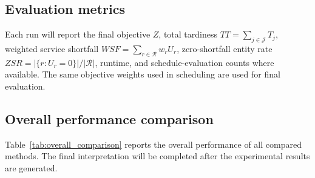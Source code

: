\documentclass[a4paper,fleqn]{cas-sc}
\begin{document}
\subsection{Evaluation metrics}
\label{sec:evaluation_metrics}

Each run will report the final objective \(Z\), total tardiness \(TT=\sum_{j\in\mathcal J}T_j\), weighted service shortfall \(WSF=\sum_{r\in\mathcal R}w_rU_r\), zero-shortfall entity rate \(ZSR=|\{r:U_r=0\}|/|\mathcal R|\), runtime, and schedule-evaluation counts where available. The same objective weights used in scheduling are used for final evaluation.

\subsection{Overall performance comparison}
\label{sec:overall_comparison}

Table~\ref{tab:overall_comparison} reports the overall performance of all compared methods. The final interpretation will be completed after the experimental results are generated.
\end{document}
